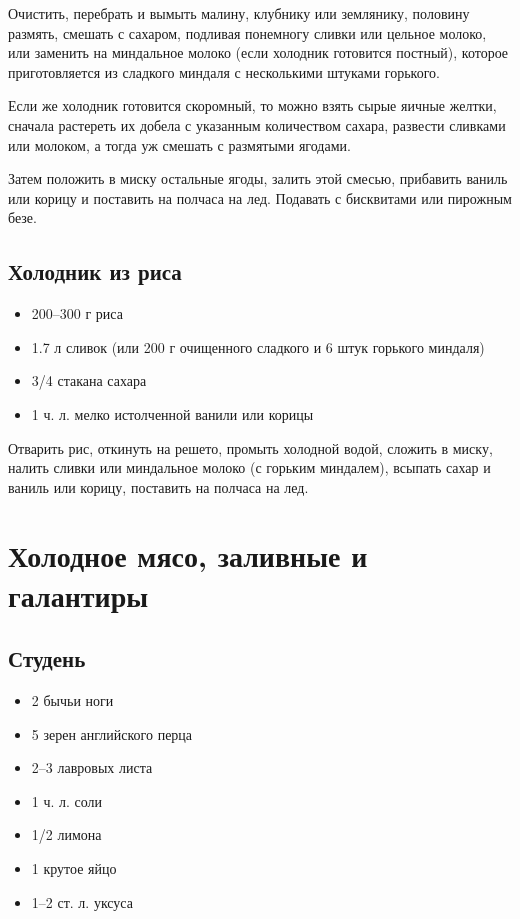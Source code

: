 Очистить, перебрать и вымыть малину, клубнику или землянику, половину размять, смешать с сахаром, подливая понемногу сливки или цельное молоко, или заменить на миндальное молоко (если холодник готовится постный), которое приготовляется из сладкого миндаля с несколькими штуками горького.

Если же холодник готовится скоромный, то можно взять сырые яичные желтки, сначала растереть их добела с указанным количеством сахара, развести сливками или молоком, а тогда уж смешать с размятыми ягодами.

Затем положить в миску остальные ягоды, залить этой смесью, прибавить ваниль или корицу и поставить на полчаса на лед. Подавать с бисквитами или пирожным безе.

\subsection{Холодник из риса}

\begin{itemize}
	\item 200–300 г риса 
    \item 1.7 л сливок (или 200 г очищенного сладкого и 6 штук горького миндаля) 
    \item 3/4 стакана сахара
    \item 1 ч. л. мелко истолченной ванили или корицы
\end{itemize}

Отварить рис, откинуть на решето, промыть холодной водой, сложить в миску, налить сливки или миндальное молоко (с горьким миндалем), всыпать сахар и ваниль или корицу, поставить на полчаса на лед.

\newpage
\section{Холодное мясо, заливные и галантиры}

\subsection{Студень}

\begin{itemize}
	\item 2 бычьи ноги 
    \item 5 зерен английского перца
    \item 2–3 лавровых листа
    \item 1 ч. л. соли
    \item 1/2 лимона
    \item 1 крутое яйцо
    \item 1–2 ст. л. уксуса
\end{itemize}

